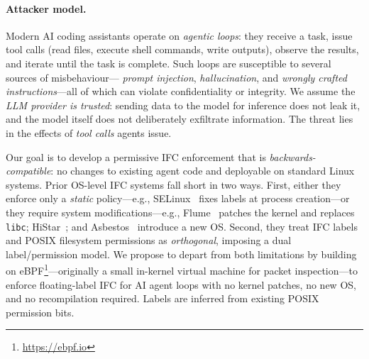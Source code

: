\documentclass{kaw}
\begin{document}
\paragraph{Attacker model.}
Modern AI coding assistants operate on \emph{agentic loops}: they receive a
task, issue tool calls (read files, execute shell commands, write outputs),
observe the results, and iterate until the task is complete.
%
Such loops are susceptible to several sources of misbehaviour---%
\emph{prompt injection}, \emph{hallucination}, and \emph{wrongly crafted
instructions}---all of which can violate confidentiality or integrity.
%
%
We assume the \emph{LLM provider is trusted}: sending data to the model for
inference does not leak it, and the model itself does not deliberately
exfiltrate information.
%
The threat lies in the effects of \emph{tool calls} agents issue.

Our goal is to develop a permissive IFC enforcement that is \emph{backwards-compatible}: no changes
to existing agent code and deployable on standard Linux systems.
%
Prior OS-level IFC systems fall short in two ways.
%
First, either they enforce only a \emph{static} policy---e.g., SELinux~\cite{loscocco:selinux}
fixes labels at process creation---or
they require system modifications---e.g., Flume~\cite{krohn:flume} patches the kernel
and replaces \texttt{libc}; HiStar~\cite{zeldovich:histar}; and
Asbestos~\cite{Efstathopoulos:2005} introduce a new OS.
%
Second, they treat IFC labels and POSIX filesystem permissions as
\emph{orthogonal}, imposing a dual label/permission model.
%
We propose to depart from both limitations by building on
eBPF\footnote{\url{https://ebpf.io}}---originally a small in-kernel virtual machine for
packet inspection---to enforce floating-label IFC for AI agent loops with no kernel
patches, no new OS, and no recompilation required.
%
Labels are inferred from existing POSIX permission bits. 
%
\end{document}
